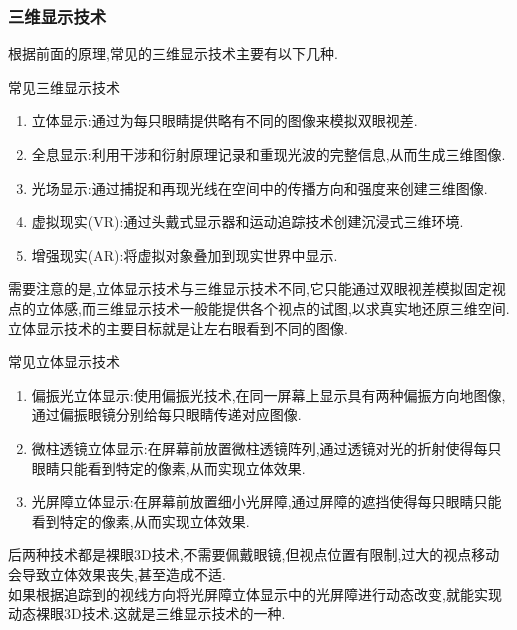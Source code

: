 \documentclass{ctexart}
\begin{document}
\subsubsection{三维显示技术}
根据前面的原理,常见的三维显示技术主要有以下几种.
\begin{other}[分类]{常见三维显示技术}
    \begin{enumerate}[label=\arabic*.,topsep=0pt,parsep=0pt,itemsep=0pt,partopsep=0pt]
        \item 立体显示:通过为每只眼睛提供略有不同的图像来模拟双眼视差.
        \item 全息显示:利用干涉和衍射原理记录和重现光波的完整信息,从而生成三维图像.
        \item 光场显示:通过捕捉和再现光线在空间中的传播方向和强度来创建三维图像.
        \item 虚拟现实(VR):通过头戴式显示器和运动追踪技术创建沉浸式三维环境.
        \item 增强现实(AR):将虚拟对象叠加到现实世界中显示.
    \end{enumerate}
\end{other}
需要注意的是,立体显示技术与三维显示技术不同,它只能通过双眼视差模拟固定视点的立体感,而三维显示技术一般能提供各个视点的试图,以求真实地还原三维空间.立体显示技术的主要目标就是让左右眼看到不同的图像.
\begin{other}[分类]{常见立体显示技术}
    \begin{enumerate}[label=\arabic*.,topsep=0pt,parsep=0pt,itemsep=0pt,partopsep=0pt]
        \item 偏振光立体显示:使用偏振光技术,在同一屏幕上显示具有两种偏振方向地图像,通过偏振眼镜分别给每只眼睛传递对应图像.
        \item 微柱透镜立体显示:在屏幕前放置微柱透镜阵列,通过透镜对光的折射使得每只眼睛只能看到特定的像素,从而实现立体效果.
        \item 光屏障立体显示:在屏幕前放置细小光屏障,通过屏障的遮挡使得每只眼睛只能看到特定的像素,从而实现立体效果.
    \end{enumerate}
\end{other}
后两种技术都是裸眼3D技术,不需要佩戴眼镜,但视点位置有限制,过大的视点移动会导致立体效果丧失,甚至造成不适.\\
\indent 如果根据追踪到的视线方向将光屏障立体显示中的光屏障进行动态改变,就能实现动态裸眼3D技术.这就是三维显示技术的一种.
\end{document}
